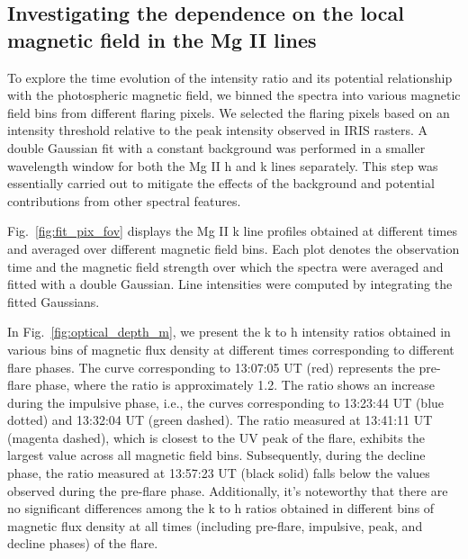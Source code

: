 \subsection{Investigating the dependence on the local magnetic field in the Mg II lines}

To explore the time evolution of the intensity ratio and its potential relationship with the photospheric magnetic field, we binned the spectra into various magnetic field bins from different flaring pixels. We selected the flaring pixels based on an intensity threshold relative to the peak intensity observed in IRIS rasters. A double Gaussian fit with a constant background was performed in a smaller wavelength window for both the Mg II h and k lines separately. This step was essentially carried out to mitigate the effects of the background and potential contributions from other spectral features.

Fig.~\ref{fig:fit_pix_fov} displays the Mg II k line profiles obtained at different times and averaged over different magnetic field bins. Each plot denotes the observation time and the magnetic field strength over which the spectra were averaged and fitted with a double Gaussian. Line intensities were computed by integrating the fitted Gaussians.

In Fig.~\ref{fig:optical_depth_m}, we present the k to h intensity ratios obtained in various bins of magnetic flux density at different times corresponding to different flare phases. The curve corresponding to 13:07:05 UT (red) represents the pre-flare phase, where the ratio is approximately 1.2. The ratio shows an increase during the impulsive phase, i.e., the curves corresponding to 13:23:44 UT (blue dotted) and 13:32:04 UT (green dashed). The ratio measured at 13:41:11 UT (magenta dashed), which is closest to the UV peak of the flare, exhibits the largest value across all magnetic field bins. Subsequently, during the decline phase, the ratio measured at 13:57:23 UT (black solid) falls below the values observed during the pre-flare phase. Additionally, it's noteworthy that there are no significant differences among the k to h ratios obtained in different bins of magnetic flux density at all times (including pre-flare, impulsive, peak, and decline phases) of the flare.


